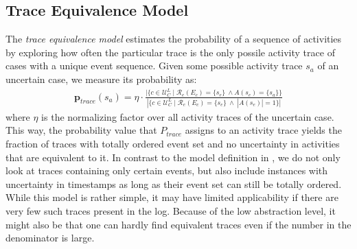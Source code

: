 \subsection{Trace Equivalence Model}
The \textit{trace equivalence model} estimates the probability of a sequence of activities by exploring how often the particular trace is the only possile activity trace of cases with a unique event sequence.
Given some possible activity trace $s_a$ of an uncertain case, we measure its probability as:
\begin{align*}
\textbf{p}_{trace}(s_a) = \eta \cdot \frac{|\{ c \in \mathcal{U}_C^L \mid \mathcal{R}_e(E_c)= \{s_e\} ~ \wedge A(s_e)= \{s_a \} \} }
{|\{ c \in \mathcal{U}_C^L \mid \mathcal{R}_e(E_c)= \{s_e\} ~ \wedge ~ |A(s_e)| = 1\}|}
\end{align*}
where $\eta$ is the normalizing factor over all activity traces of the uncertain case.\\
This way, the probability value that $P_{trace}$ assigns to an activity trace yields the fraction of traces with totally ordered event set and no uncertainty in activities that are equivalent to it.
In contrast to the model definition in \cite{por}, we do not only look at traces containing only certain events, but also include instances with uncertainty in timestamps as long as their event set can still be totally ordered.
While this model is rather simple, it may have limited applicability if there are very few such traces present in the log.
Because of the low abstraction level, it might also be that one can hardly find equivalent traces even if the number in the denominator is large.


